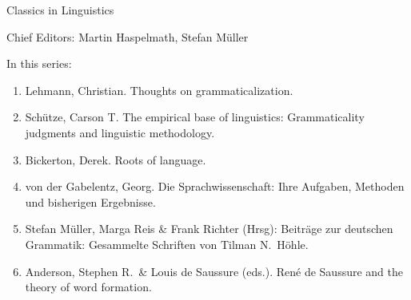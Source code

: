 {\large Classics in Linguistics}

\bigskip

Chief Editors: Martin Haspelmath, Stefan Müller

\bigskip

In this series:

\begin{enumerate}
\item Lehmann, Christian. Thoughts on grammaticalization.
\item Schütze, Carson T. The empirical base of linguistics: Grammaticality judgments and linguistic methodology.
\item Bickerton, Derek. Roots of language.
\item von der Gabelentz, Georg. Die Sprachwissenschaft:  Ihre Aufgaben, Methoden und bisherigen Ergebnisse. 
\item Stefan Müller, Marga Reis \& Frank Richter (Hrsg): Beiträge zur deutschen Grammatik: Gesammelte Schriften von Tilman N.\ Höhle.
\item Anderson, Stephen R.\ \& Louis de Saussure (eds.). René de Saussure and the theory of word formation.
\end{enumerate}


\vfill

